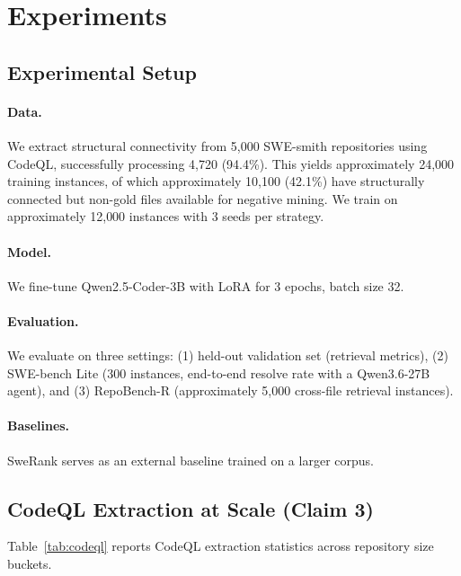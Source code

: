 \documentclass[11pt]{article}
\begin{document}
\section{Experiments}
\label{sec:exp}

\subsection{Experimental Setup}

\paragraph{Data.}
We extract structural connectivity from 5{,}000 SWE-smith repositories using CodeQL, successfully processing 4{,}720 (94.4\%).
This yields approximately 24{,}000 training instances, of which approximately 10{,}100 (42.1\%) have structurally connected but non-gold files available for negative mining.
We train on approximately 12{,}000 instances with 3 seeds per strategy.

\paragraph{Model.}
We fine-tune Qwen2.5-Coder-3B with LoRA for 3 epochs, batch size 32.

\paragraph{Evaluation.}
We evaluate on three settings: (1) held-out validation set (retrieval metrics), (2) SWE-bench Lite (300 instances, end-to-end resolve rate with a Qwen3.6-27B agent), and (3) RepoBench-R (approximately 5{,}000 cross-file retrieval instances).

\paragraph{Baselines.}
SweRank serves as an external baseline trained on a larger corpus.

\subsection{CodeQL Extraction at Scale (Claim 3)}

Table~\ref{tab:codeql} reports CodeQL extraction statistics across repository size buckets.
\end{document}
